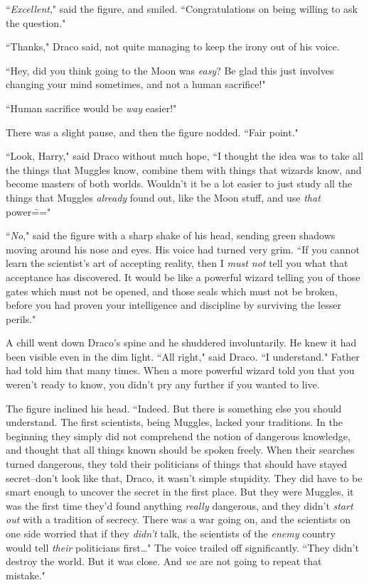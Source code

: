 ``\emph{Excellent}," said the figure, and smiled. ``Congratulations on being willing to ask the question."

``Thanks," Draco said, not quite managing to keep the irony out of his voice.

``Hey, did you think going to the Moon was \emph{easy}? Be glad this just involves changing your mind sometimes, and not a human sacrifice!"

``Human sacrifice would be \emph{way} easier!"

There was a slight pause, and then the figure nodded. ``Fair point."

``Look, Harry," said Draco without much hope, ``I thought the idea was to take all the things that Muggles know, combine them with things that wizards know, and become masters of both worlds. Wouldn't it be a lot easier to just study all the things that Muggles \emph{already} found out, like the Moon stuff, and use \emph{that} power\==="

``\emph{No}," said the figure with a sharp shake of his head, sending green shadows moving around his nose and eyes. His voice had turned very grim. ``If you cannot learn the scientist's art of accepting reality, then I \emph{must not} tell you what that acceptance has discovered. It would be like a powerful wizard telling you of those gates which must not be opened, and those seals which must not be broken, before you had proven your intelligence and discipline by surviving the lesser perils."

A chill went down Draco's spine and he shuddered involuntarily. He knew it had been visible even in the dim light. ``All right," said Draco. ``I understand." Father had told him that many times. When a more powerful wizard told you that you weren't ready to know, you didn't pry any further if you wanted to live.

The figure inclined his head. ``Indeed. But there is something else you should understand. The first scientists, being Muggles, lacked your traditions. In the beginning they simply did not comprehend the notion of dangerous knowledge, and thought that all things known should be spoken freely. When their searches turned dangerous, they told their politicians of things that should have stayed secret\---don't look like that, Draco, it wasn't simple stupidity. They did have to be smart enough to uncover the secret in the first place. But they were Muggles, it was the first time they'd found anything \emph{really} dangerous, and they didn't \emph{start out} with a tradition of secrecy. There was a war going on, and the scientists on one side worried that if they \emph{didn't} talk, the scientists of the \emph{enemy} country would tell \emph{their} politicians first{\ldots}" The voice trailed off significantly. ``They didn't destroy the world. But it was close. And \emph{we} are not going to repeat that mistake."

